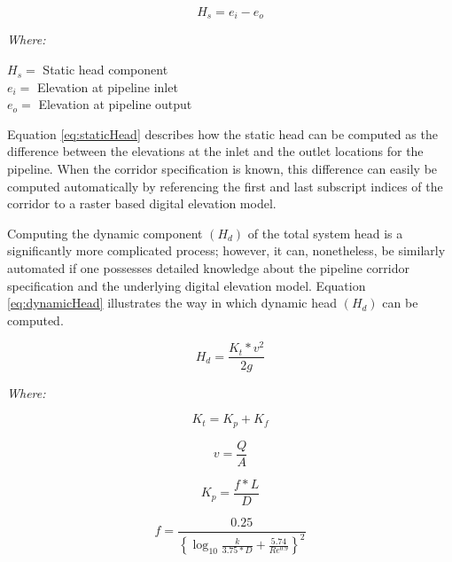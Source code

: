        \begin{equation}
          H_s = e_{i} - e_{o}  
          \label{eq:staticHead}
       \end{equation}
      
       \noindent \textit{Where:} \hfill

       \begin{center}
           $H_s = $ Static head component \\
           $e_i = $ Elevation at pipeline inlet \\
           $e_o = $ Elevation at pipeline output \\
       \end{center}

Equation \ref{eq:staticHead} describes how the static head can be computed as the difference between the elevations at the inlet and the outlet locations for the pipeline. When the corridor specification is known, this difference can easily be computed automatically by referencing the first and last subscript indices of the corridor to a raster based digital elevation model.

Computing the dynamic component $(H_d)$ of the total system head is a significantly more complicated process; however, it can, nonetheless, be similarly automated if one possesses detailed knowledge about the pipeline corridor specification and the underlying digital elevation model. Equation \ref{eq:dynamicHead} illustrates the way in which dynamic head $(H_d)$ can be computed. 

       \begin{equation}
          H_d = \frac{K_{t} * v^2}{2g}
          \label{eq:dynamicHead}
       \end{equation}
       
       \noindent \textit{Where:} \hfill

       \begin{equation}
           K_{t} = K_{p} + K_{f}
           \label{eq:totalLosses}
       \end{equation}
       
       \begin{equation}
           v = \frac{Q}{A}
           \label{eq:velocity}
       \end{equation}
       
       \begin{equation}
           K_{p} = \frac{f * L}{D}
           \label{eq:pipeLosses}
       \end{equation}
       
       \begin{equation}
           f = \frac{0.25}{ \left\{ \log_{10}{ \frac{k}{3.75 * D} + \frac{5.74}{Re^{0.9}} } \right\}^{2} }
           \label{eq:frictionCoefficient}
       \end{equation}

